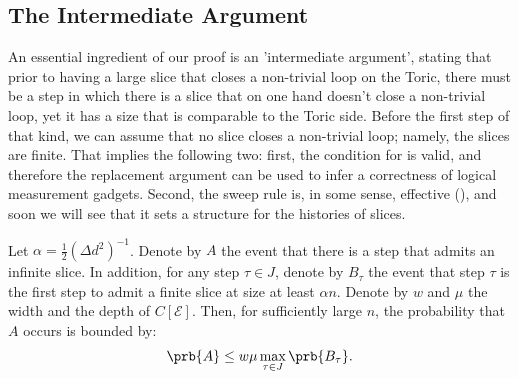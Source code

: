 \subsection{The Intermediate Argument} 
An essential ingredient of our proof is an 'intermediate argument', stating that prior to having a large slice that closes a non-trivial loop on the Toric, there must be a step in which there is a slice that on one hand doesn't close a non-trivial loop, yet it has a size that is comparable to the Toric side. Before the first step of that kind, we can assume that no slice closes a non-trivial loop; namely, the slices are finite. That implies the following two: first, the condition for  is valid, and therefore the replacement argument can be used to infer a correctness of logical measurement gadgets. Second, the sweep rule is, in some sense, effective (), and soon we will see that it sets a structure for the histories of slices. 

\begin{claim}
  \label{claim:intersyn}
  Let $\alpha = \frac{1}{2}(\Delta d^{2})^{-1}$. Denote by $A$ the event that there is a step that admits an infinite slice. In addition, for any step $\tau \in J$, denote by $B_{\tau}$ the event that step $\tau$ is the first step to admit a finite slice at size at least $\alpha n$. Denote by $w$ and $\mu$ the width and the depth of $C[\mathcal{E}]$. Then, for sufficiently large $n$, the probability that $A$ occurs is bounded by:
  \begin{equation*}
    \begin{split}
      \prb{A} \le w\mu\max_{\tau\in J }\prb{B_{\tau}}.
    \end{split}
  \end{equation*}
\end{claim}

